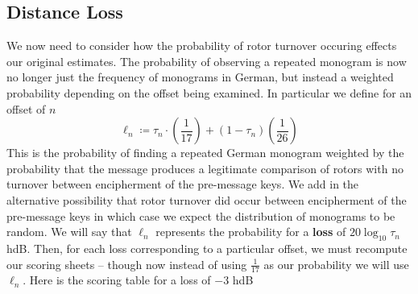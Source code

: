 \subsection{Distance Loss}
We now need to consider how the probability of rotor turnover occuring effects our original estimates. The probability of observing a repeated monogram is now no longer just the frequency of monograms in German, but instead a weighted probability depending on the offset being examined. In particular we define for an offset of $n$
\[
	\ell_n \coloneq \tau_n\cdot(\frac{1}{17}) + (1-\tau_n)(\frac{1}{26})
\]
This is the probability of finding a repeated German monogram weighted by the probability that the message produces a legitimate comparison of rotors with no turnover between encipherment of the pre-message keys. We add in the alternative possibility that rotor turnover did occur between encipherment of the pre-message keys in which case we expect the distribution of monograms to be random. We will say that $\ell_n$ represents the probability for a {\bf{loss}} of $20\log_{10}{\tau_n}$ hdB. Then, for each loss corresponding to a particular offset, we must recompute our scoring sheets -- though now instead of using $\frac{1}{17}$ as our probability we will use $\ell_n$. Here is the scoring table for a loss of $-3$ hdB
